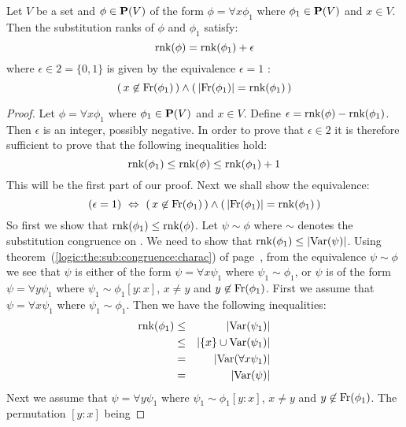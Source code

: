 \begin{prop}\label{logic:prop:FOPL:substrank:quant}
Let $V$ be a set and $\phi\in\mbox{${\bf P}(V)$}$ of the form $\phi=\forall
x\phi_{1}$ where $\phi_{1}\in\mbox{${\bf P}(V)$}$ and $x\in V$. Then the
substitution ranks of $\phi$ and $\phi_{1}$ satisfy:
    \[
    \mbox{\rm rnk}(\phi)=\mbox{\rm rnk}(\phi_{1})+\epsilon
    \]
where $\epsilon\in 2=\{0,1\}$ is given by the equivalence
$\epsilon=1$ \ifand:
    \[
    (\,x\not\in\mbox{\rm Fr}(\phi_{1})\,)\land(\,|\mbox{\rm Fr}(\phi_{1})|
    =\mbox{\rm rnk}(\phi_{1})\,)
    \]
\end{prop}
\begin{proof}
Let $\phi=\forall x\phi_{1}$ where $\phi_{1}\in\mbox{${\bf P}(V)$}$ and $x\in V$.
Define $\epsilon = \mbox{\rm rnk}(\phi)-\mbox{\rm rnk}(\phi_{1})$. Then $\epsilon$ is an
integer, possibly negative. In order to prove that $\epsilon\in 2$
it is therefore sufficient to prove that the following inequalities
hold:
    \begin{equation}\label{logic:eqn:FOPL:substrank:quant:eq1}
    \mbox{\rm rnk}(\phi_{1})\leq\mbox{\rm rnk}(\phi)\leq\mbox{\rm rnk}(\phi_{1})+1
    \end{equation}
This will be the first part of our proof. Next we shall show the
equivalence:
    \begin{equation}\label{logic:eqn:FOPL:substrank:quant:eq2}
    (\epsilon =1)\ \Leftrightarrow\
    (\,x\not\in\mbox{\rm Fr}(\phi_{1})\,)\land(\,|\mbox{\rm Fr}(\phi_{1})|
    =\mbox{\rm rnk}(\phi_{1})\,)
    \end{equation}
So first we show that $\mbox{\rm rnk}(\phi_{1})\leq\mbox{\rm rnk}(\phi)$. Let
$\psi\sim\phi$ where $\sim$ denotes the substitution congruence on
\pv. We need to show that $\mbox{\rm rnk}(\phi_{1})\leq|\mbox{\rm Var}(\psi)|$. Using
theorem~(\ref{logic:the:sub:congruence:charac}) of
page~\pageref{logic:the:sub:congruence:charac}, from the equivalence
$\psi\sim\phi$ we see that $\psi$ is either of the form
$\psi=\forall x\psi_{1}$ where $\psi_{1}\sim\phi_{1}$, or $\psi$ is
of the form $\psi=\forall y\psi_{1}$ where
$\psi_{1}\sim\phi_{1}[y\!:\!x]$, $x\neq y$ and
$y\not\in\mbox{\rm Fr}(\phi_{1})$. First we assume that $\psi=\forall
x\psi_{1}$ where $\psi_{1}\sim\phi_{1}$. Then we have the following
inequalities:
    \begin{eqnarray*}
    \mbox{\rm rnk}(\phi_{1})&\leq&|\mbox{\rm Var}(\psi_{1})|\\
    &\leq&|\{x\}\cup\mbox{\rm Var}(\psi_{1})|\\
    &=&|\mbox{\rm Var}(\forall x\psi_{1})|\\
    &=&|\mbox{\rm Var}(\psi)|
    \end{eqnarray*}
Next we assume that $\psi=\forall y\psi_{1}$ where
$\psi_{1}\sim\phi_{1}[y\!:\!x]$, $x\neq y$ and
$y\not\in\mbox{\rm Fr}(\phi_{1})$. The permutation $[y\!:\!x]$ being

\end{proof}

